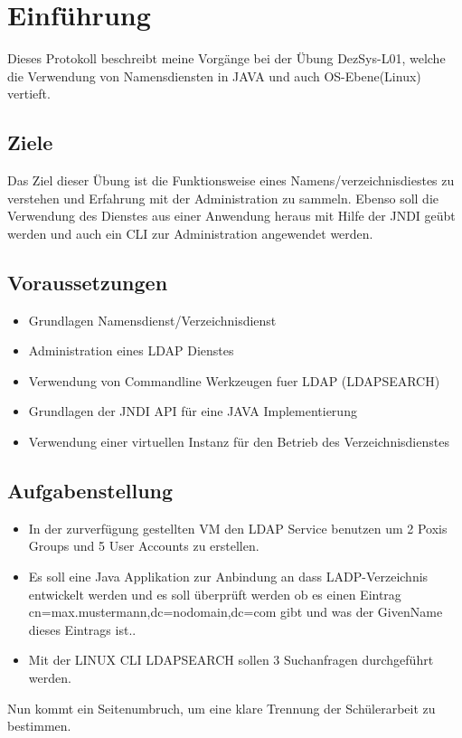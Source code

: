 
\section{Einführung}
Dieses Protokoll beschreibt meine Vorgänge bei der Übung DezSys-L01, welche die Verwendung von Namensdiensten in JAVA und auch OS-Ebene(Linux) vertieft.
\subsection{Ziele}
Das Ziel dieser Übung ist die Funktionsweise eines Namens/verzeichnisdiestes zu verstehen und Erfahrung mit der Administration zu sammeln. Ebenso soll die Verwendung des Dienstes aus einer Anwendung heraus mit Hilfe der JNDI geübt werden und auch ein CLI zur Administration angewendet werden.



\subsection{Voraussetzungen}

\begin{itemize}
	\item Grundlagen Namensdienst/Verzeichnisdienst
	\item Administration eines LDAP Dienstes
	\item Verwendung von Commandline Werkzeugen fuer LDAP (LDAPSEARCH)
	\item Grundlagen der JNDI API für eine JAVA Implementierung
	\item Verwendung einer virtuellen Instanz für den Betrieb des Verzeichnisdienstes
\end{itemize}




\subsection{Aufgabenstellung}
\begin{itemize}
	\item In der zurverfügung gestellten VM den LDAP Service benutzen um 2 Poxis Groups und 5 User Accounts zu erstellen.
	\item Es soll eine Java Applikation zur Anbindung an dass LADP-Verzeichnis entwickelt werden und es soll überprüft werden ob es einen Eintrag 	cn=max.mustermann,dc=nodomain,dc=com gibt und was der GivenName dieses Eintrags ist..
	\item Mit der LINUX CLI LDAPSEARCH sollen 3 Suchanfragen durchgeführt werden.
\end{itemize}
Nun kommt ein Seitenumbruch, um eine klare Trennung der Schülerarbeit zu bestimmen.
\clearpage
